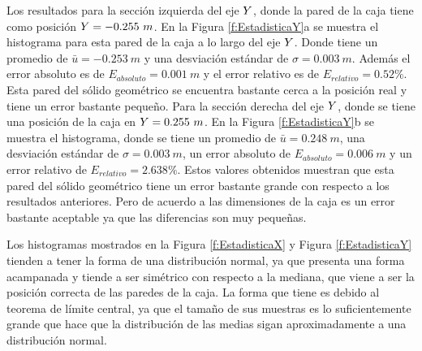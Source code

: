 
Los resultados para la sección izquierda del eje $\mathnormal Y$, donde la pared de 
la caja tiene como posición $\mathnormal Y = -0.255~m$. En la Figura \ref{f:EstadisticaY}a 
se muestra el histograma para esta pared de la caja a lo largo del eje 
$\mathnormal Y$. Donde tiene un promedio de $\bar{u} = -0.253~m$ y una desviación 
estándar de $\sigma = 0.003~m$. Además el error absoluto es de $E_{absoluto} = 0.001~m$ 
y el error relativo es de $E_{relativo} = 0.52\%$. Esta pared del sólido geométrico 
se encuentra bastante cerca a la posición real y tiene un error bastante pequeño. Para 
la sección derecha del eje $\mathnormal Y$, donde se tiene una posición de la caja en 
$\mathnormal Y = 0.255~m$. En la Figura \ref{f:EstadisticaY}b se muestra el histograma, donde
se tiene un promedio de $\bar{u} = 0.248~m$, una desviación estándar de $\sigma = 0.003~m$, 
un error absoluto de $E_{absoluto} = 0.006~m$ y un error relativo de $E_{relativo} = 
2.638\%$. Estos valores obtenidos muestran que esta pared del sólido geométrico tiene un 
error bastante grande con respecto a los resultados anteriores. Pero de acuerdo a las 
dimensiones de la caja es un error bastante aceptable ya que las diferencias son muy 
pequeñas.

Los histogramas mostrados en la Figura \ref{f:EstadisticaX} y Figura \ref{f:EstadisticaY}
tienden a tener la forma de una distribución normal, ya que presenta una forma acampanada
y tiende a ser simétrico con respecto a la mediana, que viene a ser la posición correcta 
de las paredes de la caja. La forma que tiene es debido al teorema de límite central, ya 
que el tamaño de sus muestras es lo suficientemente grande que hace que la distribución 
de las medias sigan aproximadamente a una distribución normal.

